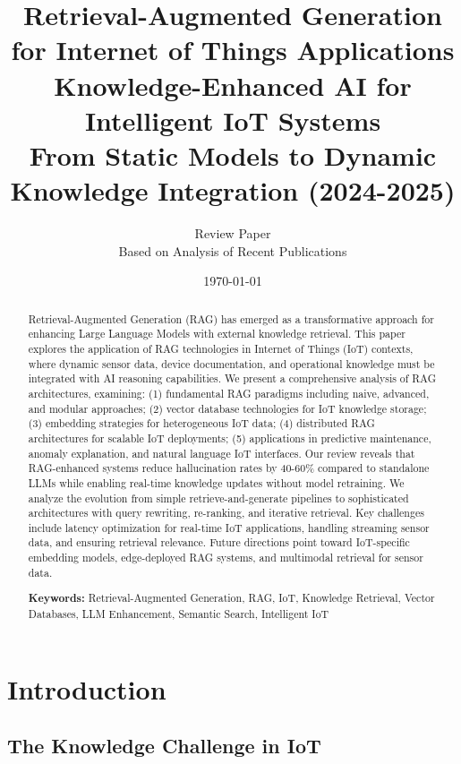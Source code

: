 \documentclass[12pt,a4paper]{article}
\title{
\vspace{-1cm}
{\Huge\bfseries Retrieval-Augmented Generation for Internet of Things Applications}\\[0.5cm]
{\Large Knowledge-Enhanced AI for Intelligent IoT Systems}\\[0.3cm]
{\large From Static Models to Dynamic Knowledge Integration (2024-2025)}
}
\author{
\large Review Paper\\[0.2cm]
\normalsize Based on Analysis of Recent Publications
}
\date{\today}
\begin{document}
\maketitle
\thispagestyle{empty}

\begin{abstract}
\noindent
Retrieval-Augmented Generation (RAG) has emerged as a transformative approach for enhancing Large Language Models with external knowledge retrieval. This paper explores the application of RAG technologies in Internet of Things (IoT) contexts, where dynamic sensor data, device documentation, and operational knowledge must be integrated with AI reasoning capabilities. We present a comprehensive analysis of RAG architectures, examining: (1) fundamental RAG paradigms including naive, advanced, and modular approaches; (2) vector database technologies for IoT knowledge storage; (3) embedding strategies for heterogeneous IoT data; (4) distributed RAG architectures for scalable IoT deployments; (5) applications in predictive maintenance, anomaly explanation, and natural language IoT interfaces. Our review reveals that RAG-enhanced systems reduce hallucination rates by 40-60\% compared to standalone LLMs while enabling real-time knowledge updates without model retraining. We analyze the evolution from simple retrieve-and-generate pipelines to sophisticated architectures with query rewriting, re-ranking, and iterative retrieval. Key challenges include latency optimization for real-time IoT applications, handling streaming sensor data, and ensuring retrieval relevance. Future directions point toward IoT-specific embedding models, edge-deployed RAG systems, and multimodal retrieval for sensor data.

\vspace{0.3cm}
\noindent\textbf{Keywords:} Retrieval-Augmented Generation, RAG, IoT, Knowledge Retrieval, Vector Databases, LLM Enhancement, Semantic Search, Intelligent IoT
\end{abstract}

\newpage
\tableofcontents
\newpage

\section{Introduction}

\subsection{The Knowledge Challenge in IoT}
\end{document}
